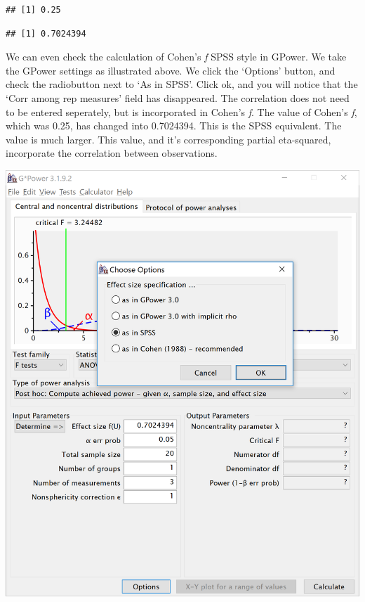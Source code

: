 \documentclass[]{book}
\newenvironment{Shaded}{\begin{snugshade}}{\end{snugshade}}
\newcommand{\KeywordTok}[1]{\textcolor[rgb]{0.13,0.29,0.53}{\textbf{#1}}}
\newcommand{\NormalTok}[1]{#1}
\newcommand{\OperatorTok}[1]{\textcolor[rgb]{0.81,0.36,0.00}{\textbf{#1}}}
\begin{document}
\begin{verbatim}
## [1] 0.25
\end{verbatim}

\begin{Shaded}
\end{Shaded}

\begin{verbatim}
## [1] 0.7024394
\end{verbatim}

We can even check the calculation of Cohen's \emph{f} SPSS style in GPower. We take the GPower settings as illustrated above. We click the `Options' button, and check the radiobutton next to `As in SPSS'. Click ok, and you will notice that the `Corr among rep measures' field has disappeared. The correlation does not need to be entered seperately, but is incorporated in Cohen's \emph{f}. The value of Cohen's \emph{f}, which was 0.25, has changed into 0.7024394. This is the SPSS equivalent. The value is much larger. This value, and it's corresponding partial eta-squared, incorporate the correlation between observations.

\includegraphics{screenshots/gpower_14.png}
\end{document}
